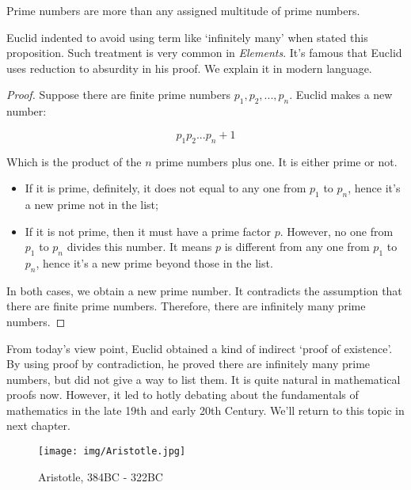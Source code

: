 \documentclass{article}
\begin{document}
\begin{proposition}
Prime numbers are more than any assigned multitude of prime numbers\cite{Elements}.
\end{proposition}

Euclid indented to avoid using term like `infinitely many' when stated this proposition. Such treatment is very common in {\em Elements}. It's famous that Euclid uses reduction to absurdity in his proof. We explain it in modern language.

\begin{proof}
Suppose there are finite prime numbers $p_1, p_2, ..., p_n$. Euclid makes a new number:

\[
p_1 p_2 ... p_n + 1
\]

Which is the product of the $n$ prime numbers plus one. It is either prime or not.

\begin{itemize}
\item If it is prime, definitely, it does not equal to any one from $p_1$ to $p_n$, hence it's a new prime not in the list;
\item If it is not prime, then it must have a prime factor $p$. However, no one from $p_1$ to $p_n$ divides this number. It means $p$ is different from any one from $p_1$ to $p_n$, hence it's a new prime beyond those in the list.
\end{itemize}

In both cases, we obtain a new prime number. It contradicts the assumption that there are finite prime numbers. Therefore, there are infinitely many prime numbers.
\end{proof}

From today's view point, Euclid obtained a kind of indirect `proof of existence'. By using proof by contradiction, he proved there are infinitely many prime numbers, but did not give a way to list them. It is quite natural in mathematical proofs now. However, it led to hotly debating about the fundamentals of mathematics in the late 19th and early 20th Century. We'll return to this topic in next chapter.

\begin{figure}[htbp]
 \centering
 \texttt{[image: img/Aristotle.jpg]}
 \captionsetup{labelformat=empty}
 \caption{Aristotle, 384BC - 322BC}
 \label{fig:Aristotle}
\end{figure}
\end{document}
